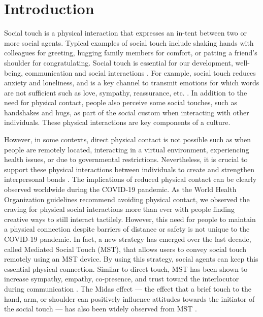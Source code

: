 \documentclass[acmsmall]{acmart}
\begin{document}
\section{Introduction}
Social touch is a physical interaction that expresses an in-tent between two or more social agents. Typical examples of social touch include shaking hands with colleagues for greeting, hugging family members for comfort, or patting a friend’s shoulder for congratulating. Social touch is essential for our development, well-being, communication and social interactions \cite{jones1985naturalistic, field2010touch, van2015social, huisman2017social}. For example, social touch reduces anxiety and loneliness, and is a key channel to transmit emotions for which words are not sufficient such as love, sympathy, reassurance, etc. \cite{field2010touch, van2015social, huisman2017social}. In addition to the need for physical contact, people also perceive some social touches, such as handshakes and hugs, as part of the social custom when interacting with other individuals. These physical interactions are key components of a culture. 

However, in some contexts, direct physical contact is not possible such as when people are remotely located, interacting in a virtual environment, experiencing health issues, or due to governmental restrictions. Nevertheless, it is crucial to support these physical interactions between individuals to create and strengthen interpersonal bonds \cite{cascio2019social, huisman2017social}. The implications of reduced physical contact can be clearly observed worldwide during the COVID-19 pandemic. As the World Health Organization guidelines recommend avoiding physical contact, we observed the craving for physical social interactions more than ever with people finding creative ways to still interact tactilely.  However, this need for people to maintain a physical connection despite barriers of distance or safety is not unique to the COVID-19 pandemic. In fact, a new strategy has emerged over the last decade, called Mediated Social Touch (MST), that allows users to convey social touch remotely using an MST device. By using this strategy, social agents can keep this essential physical connection. Similar to direct touch, MST has been shown to increase sympathy, empathy, co-presence, and trust toward the interlocutor during communication \cite{van2015social, huisman2017social, brave2001force, bailenson2008virtual, takahashi2011improving, sallnas2010haptic}. The Midas effect — the effect that a brief touch to the hand, arm, or shoulder can positively influence attitudes towards the initiator of the social touch — has also been widely observed from MST \cite{haans2014virtual, spape2015meaning}. 
\end{document}
